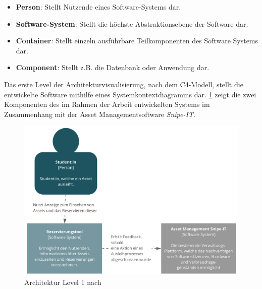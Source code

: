 \begin{itemize}
    \item \textbf{Person}: Stellt Nutzende eines Software-Systems dar.
    \item \textbf{Software-System}: Stellt die höchste Abstraktionsebene der Software dar.
    \item \textbf{Container}: Stellt einzeln ausführbare Teilkomponenten des Software Systems dar.
    \item \textbf{Component}: Stellt z.B. die Datenbank oder Anwendung dar.
\end{itemize}

{\sffamily\color{maincolor}{Level 1: Context}}

Das erste Level der Architekturvisualisierung, nach dem C4-Modell, stellt die entwickelte Software
mithilfe eines Systemkontextdiagramms dar. \ref{fig:level1} zeigt die zwei Komponenten des im Rahmen
der Arbeit entwickelten Systems im Zusammenhang mit der Asset Managementsoftware \textit{Snipe-IT}.

\begin{figure}[h]
    \centering
    \includegraphics[scale=0.4]{Bilder/C4_1.pdf}
    \caption[Architektur Level 1]{Architektur Level 1 nach }
    \label{fig:level1}
\end{figure}

